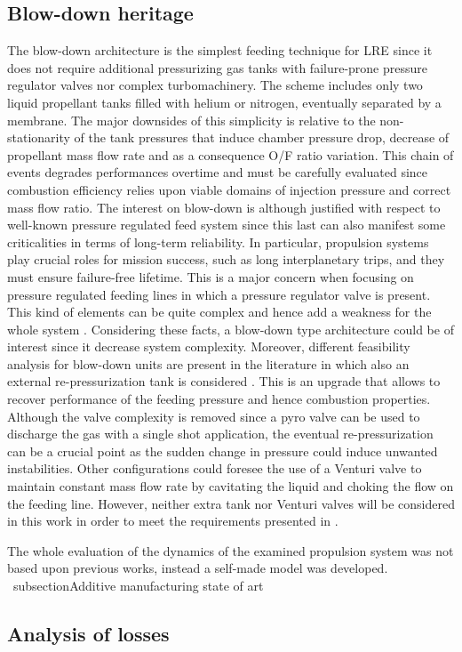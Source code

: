 \subsection{Blow-down heritage}
\label{subsec:blowdown_intro}
The blow-down architecture is the simplest feeding technique for LRE since it does not require additional pressurizing gas tanks with failure-prone pressure regulator valves nor complex turbomachinery. The scheme includes only two liquid propellant tanks filled with helium or nitrogen, eventually separated by a membrane.
The major downsides of this simplicity is relative to the non-stationarity of the tank pressures that induce chamber pressure drop, decrease of propellant mass flow rate  and as a consequence O/F ratio variation. This chain of events degrades performances overtime and must be carefully evaluated since combustion efficiency relies upon viable domains of injection pressure and correct mass flow ratio.
The interest on blow-down is although justified with respect to well-known pressure regulated feed system since this last can also manifest some criticalities in terms of long-term reliability. In particular, propulsion systems play crucial roles for mission success, such as long interplanetary trips, and they must ensure failure-free lifetime.
This is a major concern when focusing on pressure regulated feeding lines in which a pressure regulator valve is present. This kind of elements can be quite complex and hence add a weakness for the whole system \cite{valve_criticalities}.
Considering these facts, a blow-down type architecture could be of interest since it decrease system complexity. Moreover, different feasibility analysis for blow-down units are present in the literature in which also an external re-pressurization tank is considered \cite{repressurization}.
This is an upgrade that allows to recover performance of the feeding pressure and hence combustion properties. Although the valve complexity is removed since a pyro valve can be used to discharge the gas with a single shot application, the eventual re-pressurization can be a crucial point as the sudden change in pressure could induce unwanted instabilities.
Other configurations could foresee the use of a Venturi valve to maintain constant mass flow rate by cavitating the liquid and choking the flow on the feeding line. However, neither extra tank nor Venturi valves will be considered in this work in order to meet the requirements presented in \mref.

The whole evaluation of the dynamics of the examined propulsion system was not based upon previous works, instead a self-made model was developed.
\
subsection{Additive manufacturing state of art}
\label{subsec:additive_intro}

\subsection{Analysis of losses}
\label{subsec:losses_intro}